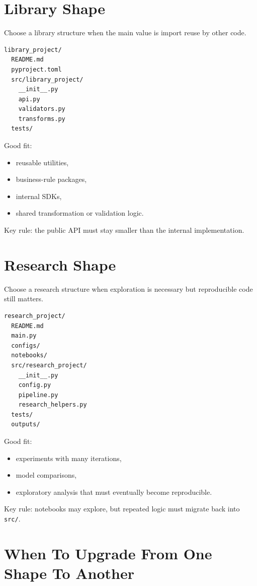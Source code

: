 \documentclass[11pt,oneside]{book}
\begin{document}
\section*{Library Shape}

Choose a library structure when the main value is import reuse by other code.

\begin{lstlisting}[style=bookcode]
library_project/
  README.md
  pyproject.toml
  src/library_project/
    __init__.py
    api.py
    validators.py
    transforms.py
  tests/
\end{lstlisting}

Good fit:
\begin{itemize}
  \item reusable utilities,
  \item business-rule packages,
  \item internal SDKs,
  \item shared transformation or validation logic.
\end{itemize}

Key rule: the public API must stay smaller than the internal implementation.

\section*{Research Shape}

Choose a research structure when exploration is necessary but reproducible code still matters.

\begin{lstlisting}[style=bookcode]
research_project/
  README.md
  main.py
  configs/
  notebooks/
  src/research_project/
    __init__.py
    config.py
    pipeline.py
    research_helpers.py
  tests/
  outputs/
\end{lstlisting}

Good fit:
\begin{itemize}
  \item experiments with many iterations,
  \item model comparisons,
  \item exploratory analysis that must eventually become reproducible.
\end{itemize}

Key rule: notebooks may explore, but repeated logic must migrate back into \texttt{src/}.

\section*{When To Upgrade From One Shape To Another}
\end{document}

